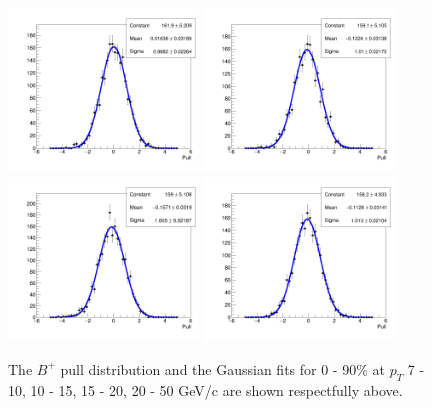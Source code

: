 \begin{figure}[h]
\begin{center}
\includegraphics[width= 0.45\textwidth]{Figures/Chapter5/BP_pull_signal_full_0_0_90.png}
\includegraphics[width= 0.45\textwidth]{Figures/Chapter5/BP_pull_signal_full_1_0_90.png}
\includegraphics[width= 0.45\textwidth]{Figures/Chapter5/BP_pull_signal_full_2_0_90.png}
\includegraphics[width= 0.45\textwidth]{Figures/Chapter5/BP_pull_signal_full_3_0_90.png}
\caption{The $B^+$ pull distribution and the Gaussian fits for 0 - 90\% at $p_T$ 7 - 10, 10 - 15, 15 - 20, 20 - 50 GeV/c are shown respectfully above.} 
\label{BPPtPull} 
\end{center}
\end{figure}

